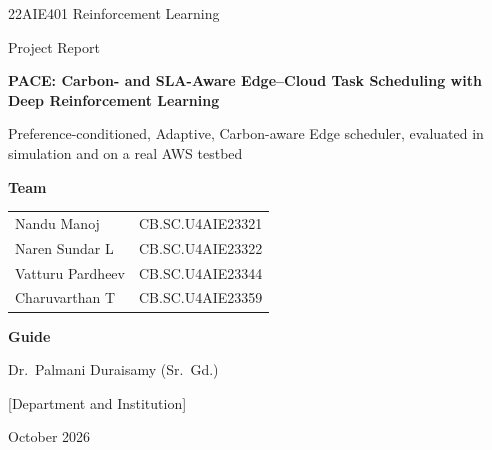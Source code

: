 \documentclass[11pt,a4paper]{article}
\newcommand{\institution}{[Department and Institution]}
\begin{document}
\begin{titlepage}
\centering
\vspace*{1.5cm}
{\Large 22AIE401 Reinforcement Learning \par}
\vspace{0.4cm}
{\large Project Report\par}
\vspace{1.6cm}
{\LARGE\bfseries PACE: Carbon- and SLA-Aware Edge--Cloud Task Scheduling with Deep Reinforcement Learning\par}
\vspace{0.6cm}
{\large Preference-conditioned, Adaptive, Carbon-aware Edge scheduler, evaluated in simulation and on a real AWS testbed\par}
\vspace{1.8cm}
{\large\bfseries Team\par}
\vspace{0.3cm}
\begin{tabular}{ll}
Nandu Manoj & CB.SC.U4AIE23321 \\
Naren Sundar L & CB.SC.U4AIE23322 \\
Vatturu Pardheev & CB.SC.U4AIE23344 \\
Charuvarthan T & CB.SC.U4AIE23359 \\
\end{tabular}
\vspace{1.4cm}

{\large\bfseries Guide\par}
\vspace{0.2cm}
{\large Dr.\ Palmani Duraisamy (Sr.\ Gd.)\par}
\vfill
{\large \institution\par}
\vspace{0.3cm}
{\large October 2026\par}
\end{titlepage}
\end{document}

